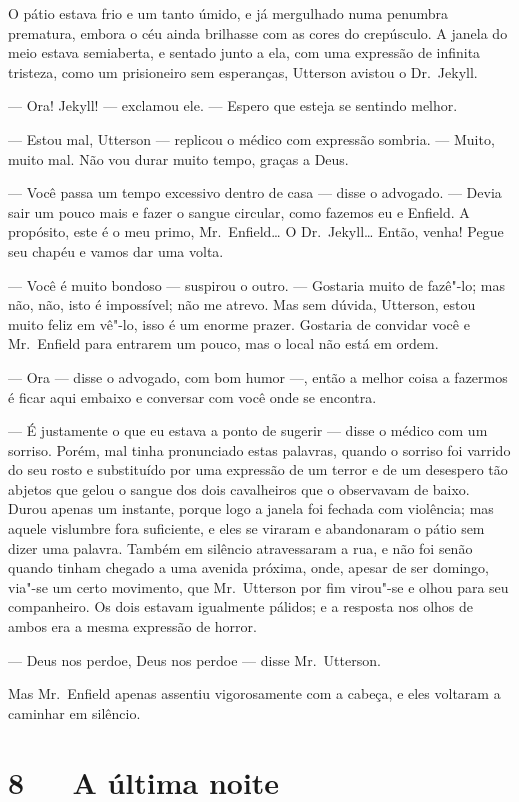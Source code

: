 O pátio estava frio e um tanto úmido, e já mergulhado numa penumbra
prematura, embora o céu ainda brilhasse com as cores do crepúsculo.  A
janela do meio estava semiaberta, e sentado junto a ela, com uma
expressão de infinita tristeza, como um prisioneiro sem esperanças,
Utterson avistou o Dr.~Jekyll.  

--- Ora!  Jekyll! --- exclamou ele.  --- Espero que esteja se sentindo
melhor.

--- Estou mal, Utterson --- replicou o médico com expressão sombria. ---
Muito, muito mal.  Não vou durar muito tempo, graças a Deus.

--- Você passa um tempo excessivo dentro de casa --- disse o advogado. ---
Devia sair um pouco mais e fazer o sangue circular, como fazemos eu e
Enfield. A propósito, este é o meu primo, Mr.~Enfield\ldots{}  O Dr.~Jekyll\ldots{} 
Então, venha!  Pegue seu chapéu e vamos dar uma volta. 

--- Você é muito bondoso --- suspirou o outro. --- Gostaria muito de
fazê"-lo; mas não, não, isto é impossível; não me atrevo.  Mas sem
dúvida, Utterson, estou muito feliz em vê"-lo, isso é um enorme prazer. 
Gostaria de convidar você e Mr.~Enfield para entrarem um pouco, mas o
local não está em ordem. 

--- Ora --- disse o advogado, com bom humor ---, então a melhor coisa a
fazermos é ficar aqui embaixo e conversar com você onde se encontra.

--- É justamente o que eu estava a ponto de sugerir --- disse o médico com
um sorriso.  Porém, mal tinha pronunciado estas palavras, quando o
sorriso foi varrido do seu rosto e substituído por uma expressão de um
terror e de um desespero tão abjetos que gelou o sangue dos dois
cavalheiros que o observavam de baixo.  Durou apenas um instante,
porque logo a janela foi fechada com violência; mas aquele vislumbre
fora suficiente, e eles se viraram e abandonaram o pátio sem dizer uma
palavra.  Também em silêncio atravessaram a rua, e não foi senão quando
tinham chegado a uma avenida próxima, onde, apesar de ser domingo, via"-se
um certo movimento, que Mr.~Utterson por fim virou"-se e olhou para seu
companheiro.  Os dois estavam igualmente pálidos; e a resposta nos
olhos de ambos era a mesma expressão de horror.

--- Deus nos perdoe, Deus nos perdoe --- disse Mr.~Utterson.

Mas Mr.~Enfield apenas assentiu vigorosamente com a cabeça, e eles
voltaram a caminhar em silêncio.


\chapter[8\ \ \ A última noite]{8\ \ \ A última noite}

